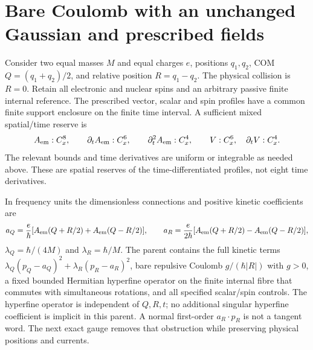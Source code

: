\documentclass[11pt]{article}
\numberwithin{equation}{section}
\theoremstyle{definition}
\theoremstyle{remark}
\begin{document}
\section{Bare Coulomb with an unchanged Gaussian and prescribed fields}
\label{p3d:sec:CRG}

Consider two equal masses $M$ and equal charges $e$, positions
$q_1,q_2$, COM $Q=(q_1+q_2)/2$, and relative position $R=q_1-q_2$.
The physical collision is $R=0$. Retain all electronic and nuclear
spins and an arbitrary passive finite internal reference.
The prescribed vector, scalar and spin profiles have a common finite
support enclosure on the finite time interval. A sufficient mixed
spatial/time reserve is
\begin{equation}\label{p3d:eq:gaugejets}
 A_{\rm em}:C_x^8,\qquad
 \partial_tA_{\rm em}:C_x^6,\qquad
 \partial_t^2A_{\rm em}:C_x^4,\qquad
 V:C_x^6,\quad \partial_tV:C_x^4.
\end{equation}
The relevant bounds and time derivatives are uniform or integrable
as needed above. These are spatial reserves of the time-differentiated
profiles, not eight time derivatives.

In frequency units the dimensionless connections and positive kinetic
coefficients are
\[
 a_Q=\frac e\hbar[A_{\rm em}(Q+R/2)+A_{\rm em}(Q-R/2)],\qquad
 a_R=\frac e{2\hbar}[A_{\rm em}(Q+R/2)-A_{\rm em}(Q-R/2)],
\]
$\lambda_Q=\hbar/(4M)$ and $\lambda_R=\hbar/M$.
The parent contains the full kinetic terms
$\lambda_Q(p_Q-a_Q)^2+\lambda_R(p_R-a_R)^2$,
bare repulsive Coulomb $g/(\hbar|R|)$ with $g>0$, a fixed bounded
Hermitian hyperfine operator on the finite internal fibre that commutes
with simultaneous rotations, and all specified scalar/spin controls.
The hyperfine operator is independent of $Q,R,t$; no additional singular
hyperfine coefficient is implicit in this parent. A normal first-order
$a_R\cdot p_R$ is not a tangent word. The next exact gauge removes
that obstruction while preserving physical positions and currents.
\end{document}

